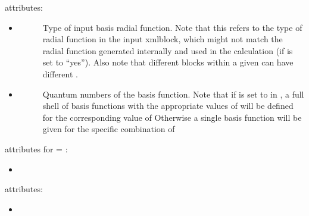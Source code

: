 \documentclass[letterpaper,10pt,english]{sphinxmanual}
\begin{document}
 attributes:
\begin{itemize}
\item {} \begin{description}
\item[{}] \leavevmode
Type of input basis radial function. Note that this refers to the type of radial function in the input xml\sphinxhyphen{}block, which might not match the radial function generated internally and used in the calculation (if  is set to “yes”). Also note that different  blocks within a given  can have different .

\end{description}

\item {} \begin{description}
\item[{}] \leavevmode
Quantum numbers of the basis function. Note that if
 is set to  in , a
full shell of basis functions with the appropriate values of
 will be defined for the corresponding value of
 Otherwise a single basis function will be given for the
specific combination of 

\end{description}

\end{itemize}

 attributes for  = :
\begin{itemize}
\item {} 

\end{itemize}

 attributes:
\begin{itemize}
\item {} 

\end{itemize}
\end{document}
